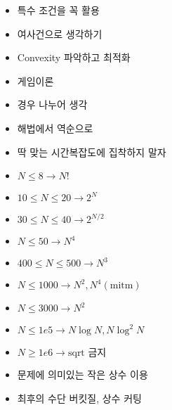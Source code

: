 \documentclass[landscape, 10pt, a4paper, oneside, twocolumn]{extarticle}
\begin{document}
\begin{itemize}
\item 특수 조건을 꼭 활용
\item 여사건으로 생각하기
\item Convexity 파악하고 최적화
\item 게임이론
\item 경우 나누어 생각
\item 해법에서 역순으로
\item 딱 맞는 시간복잡도에 집착하지 말자
\end{itemize}

\begin{itemize}
    \item $N \le 8 \rightarrow N!$
    \item $10 \le N \le 20 \rightarrow 2^N$
    \item $30 \le N \le 40 \rightarrow 2^{N/2}$
    \item $N \le 50 \rightarrow N^4$
    \item $400 \le N \le 500 \rightarrow N^3$
    \item $N \le 1000 \rightarrow N^2, N^4 (\text{mitm})$
    \item $N \le 3000 \rightarrow N^2$
    \item $N \le 1e5 \rightarrow N\log{N}, N\log^2{N}$
    \item $N \ge 1e6 \rightarrow \text{sqrt 금지}$
    \item 문제에 의미있는 작은 상수 이용
    \item 최후의 수단 버킷질, 상수 커팅
\end{itemize}
\end{document}
